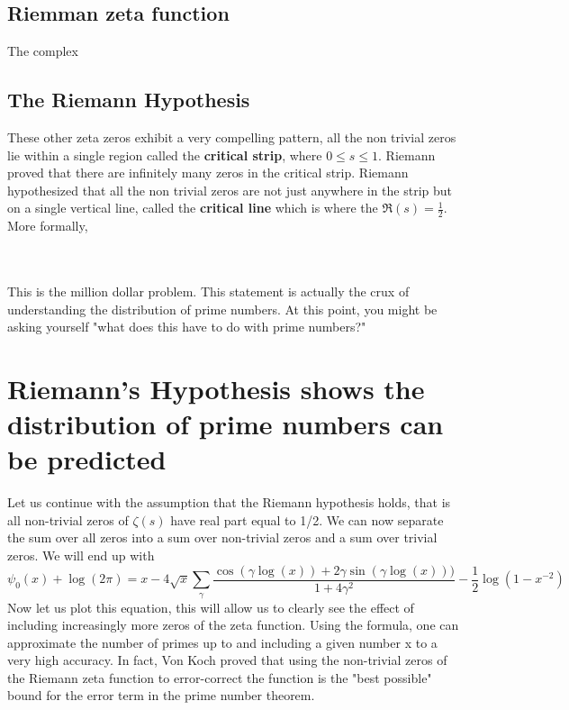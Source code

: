 \documentclass[12pt]{amsart} %
\theoremstyle{definition}
\theoremstyle{remark}
\numberwithin{equation}{section}
\begin{document}
\subsection{Riemman zeta function }
The complex 

\subsection{The Riemann Hypothesis}  These other zeta zeros exhibit a very compelling pattern, all the non trivial zeros lie within a single region called the \textbf{critical strip}, where $0\le s \le 1 $. Riemann proved that there are infinitely many zeros in the critical strip. Riemann hypothesized that all the non trivial zeros are not just anywhere in the strip but on a single vertical line, called the \textbf{critical line} which is where the $\Re(s) = \frac{1}{2}$. More formally,

\\

\noindent{}
\\

This is the million dollar problem. This statement is actually the crux of understanding the distribution of prime numbers.  At this point, you might be asking yourself "what does this have to do with prime numbers?"

\section{Riemann's Hypothesis shows the distribution of prime numbers can be predicted}
Let us continue with the assumption that the Riemann hypothesis holds, that is all non-trivial zeros of $\zeta(s)$ have real part equal to 1/2. We can now separate the sum over all zeros into a sum over non-trivial zeros and a sum over trivial zeros. We will end up with 
$$\psi_0(x) + \log(2\pi) = x- 4\sqrt{x}\sum_\gamma{\frac{\cos(\gamma \log(x))+2\gamma \sin(\gamma \log(x)))}{1+4\gamma^2}} -\frac{1}{2}\log(1-x^{-2})$$
Now let us plot this equation, this will allow us to clearly see the effect of including increasingly more zeros of the zeta function. Using the formula, one can approximate the number of primes up to and including a given number x to a very high accuracy. In fact, Von Koch proved that using the non-trivial zeros of the Riemann zeta function to error-correct the function is the "best possible" bound for the error term in the prime number theorem.
    
\end{document}
